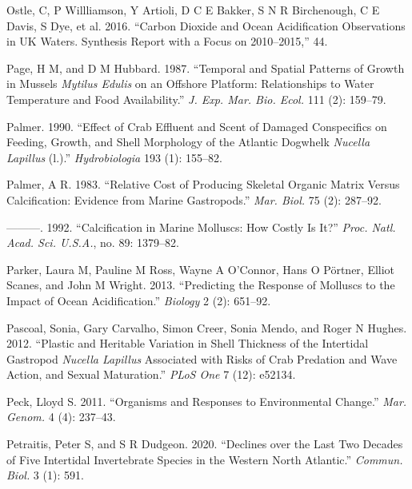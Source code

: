 \documentclass[smallextended]{svjour3}       %
\newlength{\cslhangindent}
\newenvironment{CSLReferences}[2] %
 {%
  \setlength{\parindent}{0pt}
  \ifodd #1 \everypar{\setlength{\hangindent}{\cslhangindent}}\ignorespaces\fi
  \ifnum #2 > 0
  \setlength{\parskip}{#2\baselineskip}
  \fi
 }%
 {}
\begin{document}
\begin{CSLReferences}{1}{0}
\leavevmode{}%
Ostle, C, P Willliamson, Y Artioli, D C E Bakker, S N R Birchenough, C E
Davis, S Dye, et al. 2016. {``Carbon Dioxide and Ocean Acidification
Observations in UK Waters. Synthesis Report with a Focus on
2010--2015,''} 44.

\leavevmode{}%
Page, H M, and D M Hubbard. 1987. {``Temporal and Spatial Patterns of
Growth in Mussels \emph{Mytilus Edulis} on an Offshore Platform:
Relationships to Water Temperature and Food Availability.''} \emph{J.
Exp. Mar. Bio. Ecol.} 111 (2): 159--79.

\leavevmode{}%
Palmer. 1990. {``Effect of Crab Effluent and Scent of Damaged
Conspecifics on Feeding, Growth, and Shell Morphology of the Atlantic
Dogwhelk \emph{Nucella Lapillus} (l.).''} \emph{Hydrobiologia} 193 (1):
155--82.

\leavevmode{}%
Palmer, A R. 1983. {``Relative Cost of Producing Skeletal Organic Matrix
Versus Calcification: Evidence from Marine Gastropods.''} \emph{Mar.
Biol.} 75 (2): 287--92.

\leavevmode{}%
---------. 1992. {``Calcification in Marine Molluscs: How Costly Is
It?''} \emph{Proc. Natl. Acad. Sci. U.S.A.}, no. 89: 1379--82.

\leavevmode{}%
Parker, Laura M, Pauline M Ross, Wayne A O'Connor, Hans O Pörtner,
Elliot Scanes, and John M Wright. 2013. {``Predicting the Response of
Molluscs to the Impact of Ocean Acidification.''} \emph{Biology} 2 (2):
651--92.

\leavevmode{}%
Pascoal, Sonia, Gary Carvalho, Simon Creer, Sonia Mendo, and Roger N
Hughes. 2012. {``Plastic and Heritable Variation in Shell Thickness of
the Intertidal Gastropod \emph{Nucella Lapillus} Associated with Risks
of Crab Predation and Wave Action, and Sexual Maturation.''} \emph{PLoS
One} 7 (12): e52134.

\leavevmode{}%
Peck, Lloyd S. 2011. {``Organisms and Responses to Environmental
Change.''} \emph{Mar. Genom.} 4 (4): 237--43.

\leavevmode{}%
Petraitis, Peter S, and S R Dudgeon. 2020. {``Declines over the Last Two
Decades of Five Intertidal Invertebrate Species in the Western North
Atlantic.''} \emph{Commun. Biol.} 3 (1): 591.


\end{CSLReferences}
\end{document}
